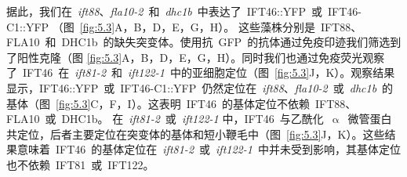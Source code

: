 据此，我们在\ \textit{ift88}、\textit{fla10-2}\ 和\ \textit{dhc1b}\ 中表达了\ IFT46::YFP\ 或\ IFT46-C1::YFP
（图\ \ref{fig:5.3}A，B，D，E，G，H）。 这些藻株分别是\ IFT88、FLA10\ 和\ DHC1b\ 的缺失突变体。使用抗\ GFP\ 的抗体通过免疫印迹我们筛选到了阳性克隆（图
\ref{fig:5.3}A，B，D，E，G，H）。同时我们也通过免疫荧光观察了\ IFT46\ 在\ \textit{ift81-2}\ 和\ \textit{ift122-1}\ 中的亚细胞定位（图\ \ref{fig:5.3}J，K）。观察结果显示，IFT46::YFP\ 或\ IFT46-C1::YFP\ 仍然定位在\
\textit{ift88}、\textit{fla10-2}\ 或\ \textit{dhc1b}\ 的基体（图\ \ref{fig:5.3}C，F，I）。这表明\ IFT46\ 的基体定位不依赖\ IFT88、FLA10\ 或\ DHC1b。 在\ \textit{ift81-2}\ 或\ \textit{ift122-1} 中，IFT46\ 与乙酰化\ $\upalpha$\ 微管蛋白共定位，后者主要定位在突变体的基体和短小鞭毛中（图\ \ref{fig:5.3}J，K）。这些结果意味着\ IFT46\ 的基体定位在\ \textit{ift81-2}\ 或\
\textit{ift122-1}\ 中并未受到影响，其基体定位也不依赖\ IFT81\ 或\ IFT122。

